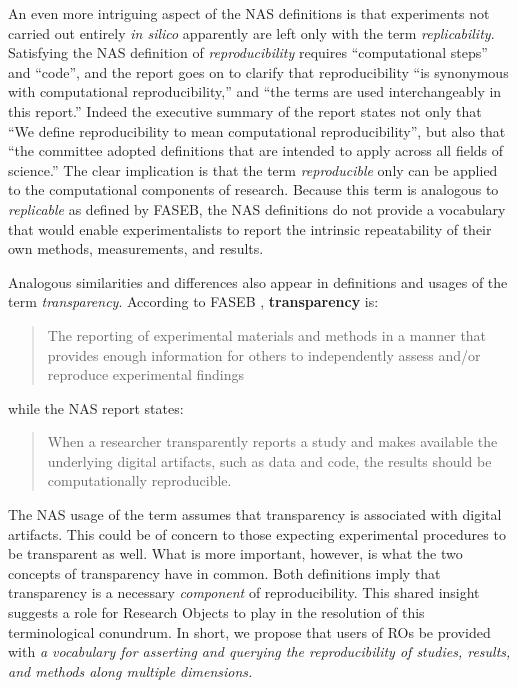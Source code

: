  An even more intriguing aspect of the NAS definitions \cite{committeeonreproducibilityandreplicabilityinscience2019reproducibility} 
	is that experiments not carried out 
	entirely \emph{in silico} apparently are left only with the term \emph{replicability}.  
Satisfying the NAS definition of \emph{reproducibility} requires 
	``computational steps'' and ``code'', and the report goes on to clarify
	that reproducibility ``is synonymous with computational reproducibility,''  and ``the terms are used interchangeably in this report.''
Indeed the executive summary of the report states not only that ``We define reproducibility to mean computational reproducibility'',
	but also that ``the committee adopted definitions that are intended to apply across all fields of science.''
The clear implication is that the term \emph{reproducible} only can be applied to the computational components of research.
Because this term is analogous to \emph{replicable} as defined by FASEB, the NAS definitions do not provide a vocabulary 
	that would enable experimentalists to report the intrinsic repeatability of their own methods, measurements, and results. 

Analogous similarities and differences also appear in definitions and usages of the term \emph{transparency}. 
According to FASEB \cite{FASEB2016enhancing}, \textbf{transparency} is: 
\begin{quote}
	The reporting of experimental materials and methods in a manner that provides enough information 
	for others to independently assess and/or reproduce experimental findings
      \end{quote}
while the NAS report \cite{committeeonreproducibilityandreplicabilityinscience2019reproducibility} states:
 \begin{quote}
	When a researcher transparently reports a study and makes available the underlying digital artifacts, such as data and code, 
	the results should be computationally reproducible.
      \end{quote}
 
\noindent The NAS usage of the term assumes that transparency is associated with digital artifacts.  
This could be of concern to those expecting experimental procedures to be transparent as well.
What is more important, however, is what the two concepts of transparency have in common.
Both definitions imply that transparency is a necessary \emph{component} of reproducibility.
This shared insight suggests a role for Research Objects to play in the resolution of this terminological conundrum.
In short, we propose that users of ROs be provided with \emph{a vocabulary for asserting and querying the reproducibility
          of studies, results, and methods along multiple dimensions.}

